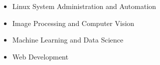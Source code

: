 

{\fontsize{11pt}{1em}\bodyfontlight\upshape\color{text}
  \begin{itemize}
\item Linux System Administration and Automation
  \item Image Processing and Computer Vision
  \item Machine Learning and Data Science
  \item Web Development
  \end{itemize}
}
